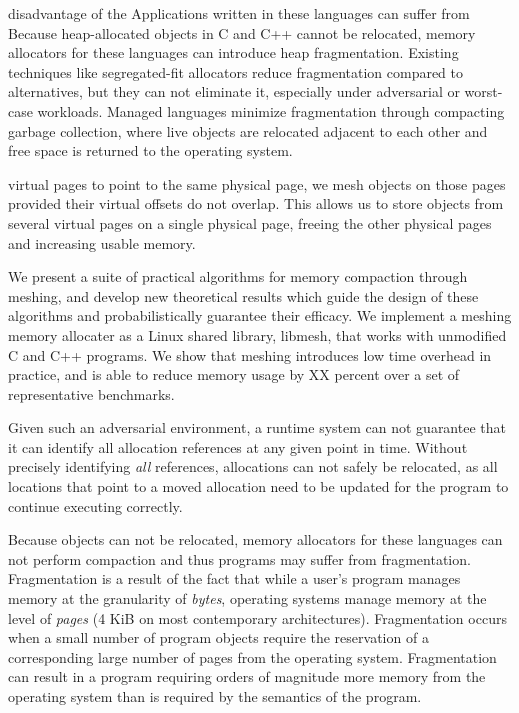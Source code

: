 disadvantage of the Applications written in these languages can suffer from
Because heap-allocated objects in C and C++ cannot be relocated,
memory allocators for these languages can introduce heap
fragmentation. Existing techniques like segregated-fit allocators
reduce fragmentation compared to alternatives, but they can not
eliminate it, especially under adversarial or worst-case
workloads. Managed languages minimize fragmentation through compacting
garbage collection, where live objects are relocated adjacent to each
other and free space is returned to the operating system.




virtual pages to point to the same physical page, we mesh objects on
those pages provided their virtual offsets do not overlap. This allows
us to store objects from several virtual pages on a single physical
page, freeing the other physical pages and increasing usable memory.

We present a suite of practical algorithms for memory compaction
through meshing, and develop new theoretical results which guide the
design of these algorithms and probabilistically guarantee their
efficacy.  We implement a meshing memory allocater as a Linux shared
library, libmesh, that works with unmodified C and C++ programs.  We
show that meshing introduces low time overhead in practice, and is
able to reduce memory usage by XX percent over a set of representative
benchmarks.


Given such an adversarial
environment, a runtime system can not guarantee that it can identify
all allocation references at any given point in time.  Without
precisely identifying \textit{all} references, allocations can not
safely be relocated, as all locations that point to a moved allocation
need to be updated for the program to continue executing correctly.

Because objects can not be relocated, memory allocators for these
languages can not perform compaction and thus programs may suffer from
fragmentation.  Fragmentation is a result of the fact that while a
user's program manages memory at the granularity of \textit{bytes},
operating systems manage memory at the level of \textit{pages} (4 KiB
on most contemporary architectures).  Fragmentation occurs when a
small number of program objects require the reservation of a
corresponding large number of pages from the operating system.
Fragmentation can result in a program requiring orders of magnitude
more memory from the operating system than is required by the
semantics of the program.


